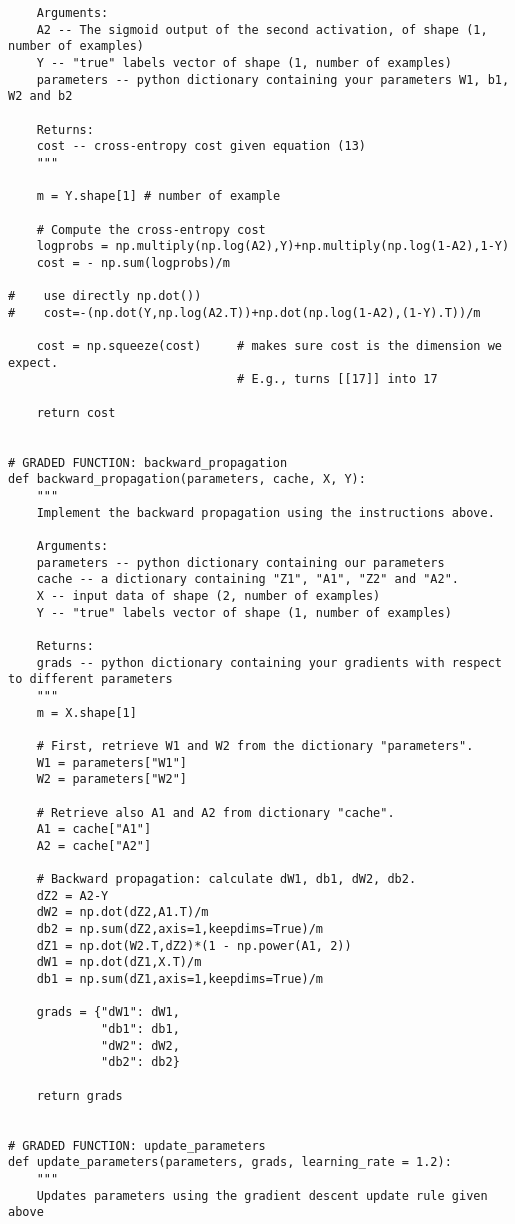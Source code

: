 \begin{verbatim}
    Arguments:
    A2 -- The sigmoid output of the second activation, of shape (1, number of examples)
    Y -- "true" labels vector of shape (1, number of examples)
    parameters -- python dictionary containing your parameters W1, b1, W2 and b2
    
    Returns:
    cost -- cross-entropy cost given equation (13)
    """
    
    m = Y.shape[1] # number of example

    # Compute the cross-entropy cost
    logprobs = np.multiply(np.log(A2),Y)+np.multiply(np.log(1-A2),1-Y)
    cost = - np.sum(logprobs)/m

#    use directly np.dot())
#    cost=-(np.dot(Y,np.log(A2.T))+np.dot(np.log(1-A2),(1-Y).T))/m
    
    cost = np.squeeze(cost)     # makes sure cost is the dimension we expect. 
                                # E.g., turns [[17]] into 17 
    
    return cost


# GRADED FUNCTION: backward_propagation
def backward_propagation(parameters, cache, X, Y):
    """
    Implement the backward propagation using the instructions above.
    
    Arguments:
    parameters -- python dictionary containing our parameters 
    cache -- a dictionary containing "Z1", "A1", "Z2" and "A2".
    X -- input data of shape (2, number of examples)
    Y -- "true" labels vector of shape (1, number of examples)
    
    Returns:
    grads -- python dictionary containing your gradients with respect to different parameters
    """
    m = X.shape[1]
    
    # First, retrieve W1 and W2 from the dictionary "parameters".
    W1 = parameters["W1"]
    W2 = parameters["W2"]
        
    # Retrieve also A1 and A2 from dictionary "cache".
    A1 = cache["A1"]
    A2 = cache["A2"]
    
    # Backward propagation: calculate dW1, db1, dW2, db2. 
    dZ2 = A2-Y
    dW2 = np.dot(dZ2,A1.T)/m
    db2 = np.sum(dZ2,axis=1,keepdims=True)/m
    dZ1 = np.dot(W2.T,dZ2)*(1 - np.power(A1, 2))
    dW1 = np.dot(dZ1,X.T)/m
    db1 = np.sum(dZ1,axis=1,keepdims=True)/m
    
    grads = {"dW1": dW1,
             "db1": db1,
             "dW2": dW2,
             "db2": db2}
    
    return grads


# GRADED FUNCTION: update_parameters
def update_parameters(parameters, grads, learning_rate = 1.2):
    """
    Updates parameters using the gradient descent update rule given above
    

\end{verbatim}

